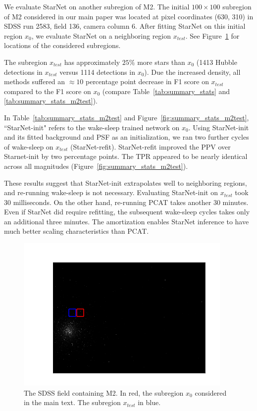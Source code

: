 
We evaluate StarNet on another subregion of M2.
The initial $100\times100$ subregion of M2 considered in our main paper was located at pixel coordinates (630, 310) in SDSS run 2583, field 136, camera column 6. 
After fitting StarNet on this initial region $x_0$, we evaluate StarNet on a neighboring region $x_{test}$. See Figure~\ref{fig:marked_m2} for locations of the considered subregions. 

The subregion $x_{test}$ has approximately $25\%$ more stars than $x_0$ (1413 Hubble detections in $x_{test}$ versus 1114 detections in $x_0$). 
Due the increased density, all methods suffered an $\approx10$ percentage point decrease in F1 score on $x_{test}$ compared to the F1 score on $x_0$ (compare Table~\ref{tab:summary_stats} and \ref{tab:summary_stats_m2test}). 



In Table~\ref{tab:summary_stats_m2test} and Figure~\ref{fig:summary_stats_m2test},
``StarNet-init" refers to the wake-sleep trained network on $x_0$. 
Using StarNet-init and its fitted background and PSF as an initialization, we ran two further cycles of wake-sleep on $x_{test}$ (StarNet-refit). 
StarNet-refit improved the PPV over Starnet-init by two percentage points. 
The TPR appeared to be nearly identical across all magnitudes (Figure~\ref{fig:summary_stats_m2test}). 

These results suggest that StarNet-init extrapolates well to neighboring regions, and re-running wake-sleep is not necessary. 
Evaluating StarNet-init on $x_{test}$ took 30 milliseconds. 
On the other hand, re-running PCAT takes another 30 minutes. 
Even if StarNet did require refitting, the subsequent wake-sleep cycles takes only an additional three minutes. 
The amortization enables StarNet inference to have much better scaling characteristics than PCAT. 

\begin{figure}[!ht]
    \centering
    \includegraphics{figures/m2_test/m2_regions.png}
    \caption{The SDSS field containing M2. 
    In red, the subregion $x_0$ considered in the main text. The subregion $x_{test}$ in blue. }
    \label{fig:marked_m2}
\end{figure}

